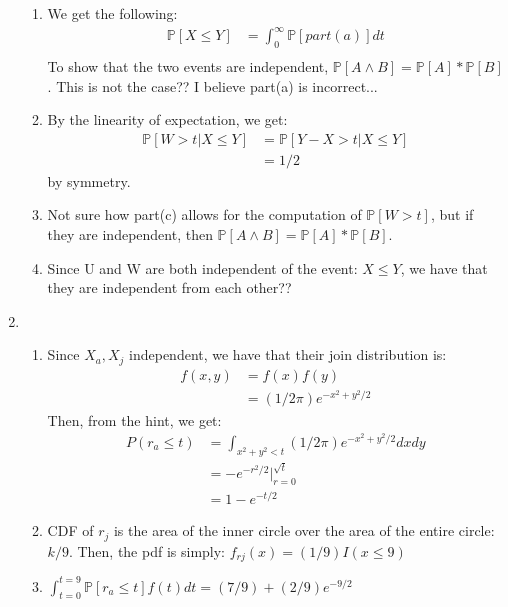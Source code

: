 \documentclass[a4paper]{article}
\renewcommand{\P}{\mathbb{P}}
\newcommand{\<}{\langle}
\renewcommand{\>}{\rangle}
\renewcommand{\^}{\wedge}
\begin{document}
\begin{enumerate}
\begin{enumerate}
            \item We get the following:
                \begin{align*}
                    \P[X \leq Y] &= \int_0^\infty \P[part(a)] dt\\
                \end{align*}
            To show that the two events are independent, $\P[A \^ B] = \P[A] * \P[B]$. This is not the case?? I believe part(a) is incorrect...
            \item By the linearity of expectation, we get:
                \begin{align*}
                    \P[W > t | X \leq Y] &= \P[Y-X > t | X \leq Y] \\
                    &= 1/2
                \end{align*}
                by symmetry.
            \item Not sure how part(c) allows for the computation of $\P[W>t]$, but if they are independent, then $\P[A \^ B] = \P[A] * \P[B]$.
            \item Since U and W are both independent of the event: $X \leq Y$, we have that they are independent from each other??
        \end{enumerate}
   \item
        \begin{enumerate}
            \item Since $X_a, X_j$ independent, we have that their join distribution is:
                \begin{align*}
                    f(x,y) &= f(x)f(y)\\
                    &= (1/2\pi) e^{-x^2 + y^2/2}
                \end{align*}
            Then, from the hint, we get:
                \begin{align*}
                    P(r_a \leq t) &= \int_{x^2 + y^2 < t} (1/2\pi)e^{-x^2+y^2/2} dxdy\\
                    &= -e^{-r^2/2}|_{r=0}^{\sqrt{t}}\\
                    &= 1 - e^{-t/2}
                \end{align*}
            \item
            CDF of $r_j$ is the area of the inner circle over the area of the entire circle: $k/9$. Then, the pdf is simply: $f_{rj}(x) = (1/9)I(x\leq9)$
            \item
            $\int_{t=0}^{t=9} \P[r_a \leq t] f(t) dt = (7/9) + (2/9)e^{-9/2}$
        \end{enumerate}

\end{enumerate}
\end{document}
